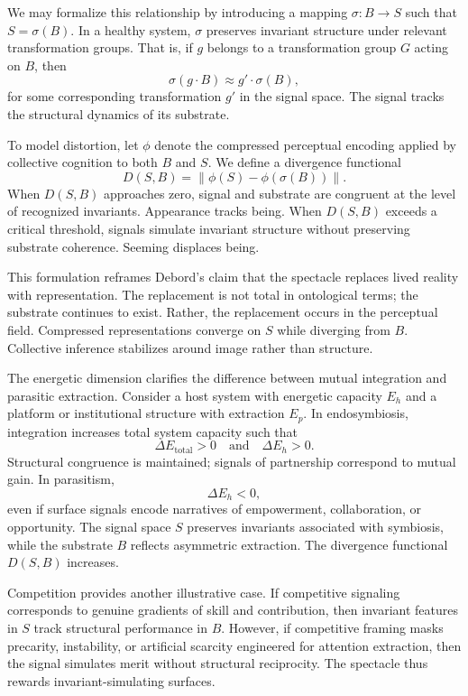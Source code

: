 \documentclass[11pt]{article}
\begin{document}
We may formalize this relationship by introducing a mapping $\sigma : B \to S$ such that $S = \sigma(B)$. In a healthy system, $\sigma$ preserves invariant structure under relevant transformation groups. That is, if $g$ belongs to a transformation group $G$ acting on $B$, then
\[
\sigma(g \cdot B) \approx g' \cdot \sigma(B),
\]
for some corresponding transformation $g'$ in the signal space. The signal tracks the structural dynamics of its substrate.

To model distortion, let $\phi$ denote the compressed perceptual encoding applied by collective cognition to both $B$ and $S$. We define a divergence functional
\[
D(S, B) = \|\phi(S) - \phi(\sigma(B))\|.
\]
When $D(S,B)$ approaches zero, signal and substrate are congruent at the level of recognized invariants. Appearance tracks being. When $D(S,B)$ exceeds a critical threshold, signals simulate invariant structure without preserving substrate coherence. Seeming displaces being.

This formulation reframes Debord’s claim that the spectacle replaces lived reality with representation. The replacement is not total in ontological terms; the substrate continues to exist. Rather, the replacement occurs in the perceptual field. Compressed representations converge on $S$ while diverging from $B$. Collective inference stabilizes around image rather than structure.

The energetic dimension clarifies the difference between mutual integration and parasitic extraction. Consider a host system with energetic capacity $E_h$ and a platform or institutional structure with extraction $E_p$. In endosymbiosis, integration increases total system capacity such that
\[
\Delta E_{\text{total}} > 0 \quad \text{and} \quad \Delta E_h > 0.
\]
Structural congruence is maintained; signals of partnership correspond to mutual gain. In parasitism,
\[
\Delta E_h < 0,
\]
even if surface signals encode narratives of empowerment, collaboration, or opportunity. The signal space $S$ preserves invariants associated with symbiosis, while the substrate $B$ reflects asymmetric extraction. The divergence functional $D(S,B)$ increases.

Competition provides another illustrative case. If competitive signaling corresponds to genuine gradients of skill and contribution, then invariant features in $S$ track structural performance in $B$. However, if competitive framing masks precarity, instability, or artificial scarcity engineered for attention extraction, then the signal simulates merit without structural reciprocity. The spectacle thus rewards invariant-simulating surfaces.
\end{document}
